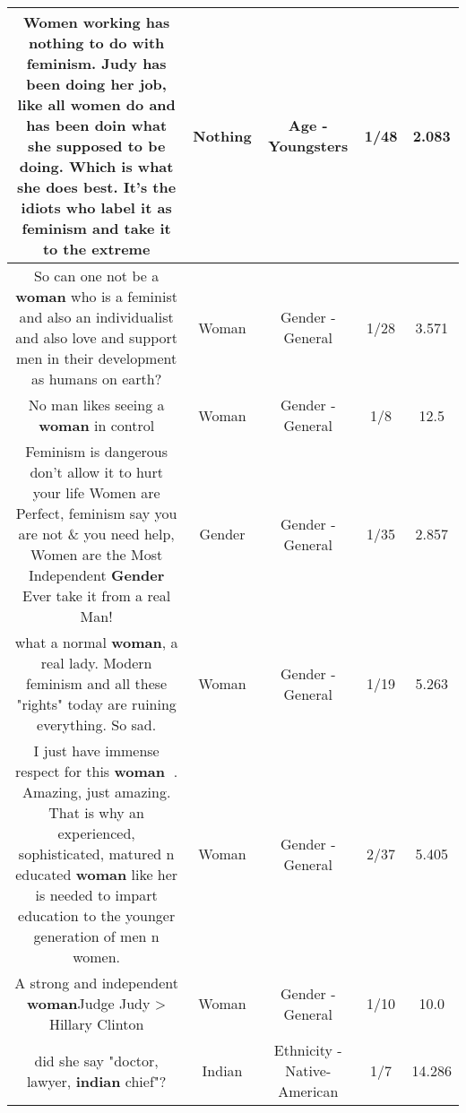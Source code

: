 \documentclass[11pt]{article}
\newlength\mylength
\begin{document}
\begin{center}
\begin{longtable}{|C{.65\mylength}|C{.30\mylength}|C{.12\mylength}|C{.12\mylength}|C{.12\mylength}|}
  \small Women working has \textbf{nothing} to do with feminism. Judy has been doing her job, like all women do and has been doin what she supposed to be doing. Which is what she does best. It's the idiots who label it as feminism and take it to the extreme\normalsize   & Nothing & Age - Youngsters & 1/48 & 2.083 \\  \hline
  \small So can one not be a \textbf{woman} who is a feminist and also an individualist and also love and support men in their development as humans on earth?\normalsize   & Woman & Gender - General & 1/28 & 3.571 \\  \hline
  \small No man likes seeing a \textbf{woman} in control\normalsize   & Woman & Gender - General & 1/8 & 12.5 \\  \hline
  \small Feminism is dangerous don't allow it to hurt your life Women are Perfect, feminism say you are not \& you need help,  Women are the Most Independent \textbf{Gender} Ever take it from a real Man!\normalsize   & Gender & Gender - General & 1/35 & 2.857 \\  \hline
  \small what a normal \textbf{woman}, a real lady. Modern feminism and all these "rights" today are ruining everything. So sad.\normalsize   & Woman & Gender - General & 1/19 & 5.263 \\  \hline
  \small I just have immense respect for this \textbf{woman} 🙏. Amazing, just amazing. That is why an experienced, sophisticated, matured n educated \textbf{woman} like her is needed to impart education to the younger generation of men n women.\normalsize   & Woman & Gender - General & 2/37 & 5.405 \\  \hline
  \small A strong and independent \textbf{woman}Judge Judy > Hillary Clinton\normalsize   & Woman & Gender - General & 1/10 & 10.0 \\  \hline
  \small did she say "doctor, lawyer, \textbf{indian} chief"?\normalsize   & Indian & Ethnicity - Native-American & 1/7 & 14.286 \\  \hline

\end{longtable}
\end{center}
\end{document}
